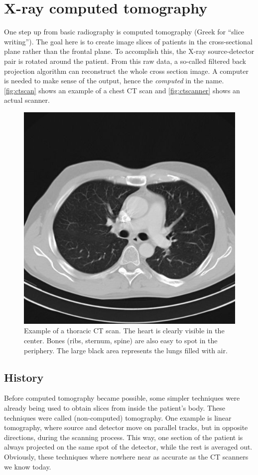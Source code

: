 \section{X-ray computed tomography}
One step up from basic radiography is computed tomography (Greek for ``slice
writing''). The goal here is to create image slices of patients in the
cross-sectional plane rather than the frontal plane. To accomplish this, the X-ray
source-detector pair is rotated around the patient. From this raw data, a
so-called filtered back projection algorithm can reconstruct the whole cross
section image. A computer is needed to make sense of the output, hence the
\emph{computed} in the name. \autoref{fig:ctscan} shows an example of a chest
CT scan and \autoref{fig:ctscanner} shows an actual scanner.

\begin{figure}[ht]
\begin{center}
  \includegraphics[width=0.4\linewidth]{img/ct-thorax.jpg}
  \caption{Example of a thoracic CT scan. The heart is clearly visible in the
  center. Bones (ribs, sternum, spine) are also easy to spot in the periphery.
  The large black area represents the lungs filled with air.}
  \label{fig:ctscan}
\end{center}
\end{figure}

\subsection{History}
Before computed tomography became possible, some simpler techniques were already
being used to obtain slices from inside the patient's body. These techniques
were called (non-computed) tomography. One example is linear tomography,
where source and detector move on parallel tracks, but in opposite directions,
during the scanning process. This way, one section of the patient is always
projected on the same spot of the detector, while the rest is averaged out.
Obviously, these techniques where nowhere near as accurate as the CT scanners we
know today.

